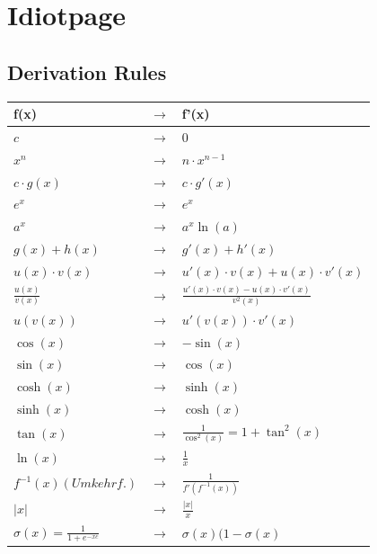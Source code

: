 \section{Idiotpage}
\subsection{Derivation Rules}

{\setlength{\extrarowheight}{4pt}
	\begin{tabular}{@{}lcl@{}}
		\textbf{f(x)} & $\rightarrow$ & \textbf{f'(x)} \\
		\toprule
		$c$ & $\rightarrow$ & $0$ \\
		$x^n$  & $\rightarrow$ & $n\cdot x^{n-1}$ \\
		$c\cdot g\left(x\right)$  & $\rightarrow$ & $c\cdot g'\left(x\right)$ \\
		$e^x$  & $\rightarrow$ & $e^x$ \\
		$a^x$ & $\rightarrow$ & $a^x\ln(a)$\\
		\midrule
		$g\left(x\right)+h\left(x\right)$  & $\rightarrow$ & $g'\left(x\right)+h'\left(x\right)$ \\
		$u\left(x\right)\cdot v\left(x\right)$  & $\rightarrow$ & $u'\left(x\right)\cdot v\left(x\right)+u\left(x\right)\cdot v'\left(x\right)$ \\ 
		$\frac{u\left(x\right)}{v\left(x\right)}$  & $\rightarrow$ & $\frac{u'\left(x\right)\cdot v\left(x\right)-u\left(x\right)\cdot v'\left(x\right)}{v^2\left(x\right)}$ \\
		$u\left(v\left(x\right)\right)$  & $\rightarrow$ & $u'\left(v\left(x\right)\right)\cdot v'\left(x\right)$ \\
		\midrule
		$\cos\left(x\right)$ & $\rightarrow$ & $-\sin(x)$ \\
		$\sin\left(x\right)$ & $\rightarrow$ & $\cos(x)$ \\	
		$\cosh\left(x\right)$ & $\rightarrow$ & $\sinh(x)$ \\
		$\sinh\left(x\right)$ & $\rightarrow$ & $\cosh(x)$ \\
		$\tan\left(x\right)$ & $\rightarrow$ & $\frac{1}{\cos^2(x)} = 1 + \tan^2(x)$ \\	
		$\ln\left(x\right)$ & $\rightarrow$ & $\frac{1}{x}$ \\
		$f^{-1}\left(x\right) {\scriptscriptstyle (Umkehrf.)}$  & $\rightarrow$ & $\frac{1}{f'(f^{-1}(x))}$ \\
		$\left|x\right|$ & $\rightarrow$ & $\frac{\left|x\right|}{x}$ \\
		\midrule
		$\sigma(x) = \frac{1}{1+ e^{-xc}}$ & $\rightarrow$ & $\sigma(x)(1 - \sigma(x)$\\
	\end{tabular}
}

